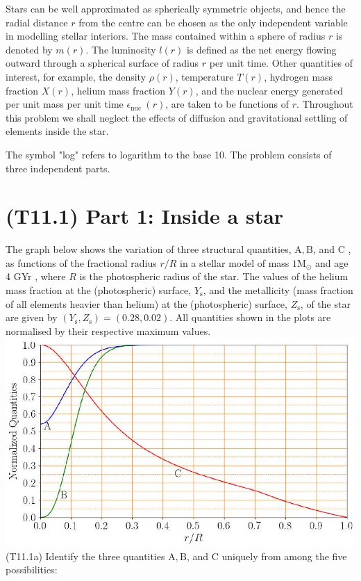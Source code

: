 \documentclass[10pt]{article}
\begin{document}
    Stars can be well approximated as spherically symmetric objects, and hence the radial distance $r$ from the centre can be chosen as the only independent variable in modelling stellar interiors. The mass contained within a sphere of radius $r$ is denoted by $m(r)$. The luminosity $l(r)$ is defined as the net energy flowing outward through a spherical surface of radius $r$ per unit time. Other quantities of interest, for example, the density $\rho(r)$, temperature $T(r)$, hydrogen mass fraction $X(r)$, helium mass fraction $Y(r)$, and the nuclear energy generated per unit mass per unit time $\epsilon_{\text {nuc }}(r)$, are taken to be functions of $r$. Throughout this problem we shall neglect the effects of diffusion and gravitational settling of elements inside the star.

    The symbol "log" refers to logarithm to the base 10. The problem consists of three independent parts.
    
    \section*{(T11.1) Part 1: Inside a star}
    The graph below shows the variation of three structural quantities, $\mathrm{A}, \mathrm{B}$, and C , as functions of the fractional radius $r / R$ in a stellar model of mass $1 \mathrm{M}_{\odot}$ and age 4 GYr , where $R$ is the photospheric radius of the star. The values of the helium mass fraction at the (photospheric) surface, $Y_{\mathrm{s}}$, and the metallicity (mass fraction of all elements heavier than helium) at the (photospheric) surface, $Z_{\mathrm{s}}$, of the star are given by $\left(Y_{\mathrm{s}}, Z_{\mathrm{s}}\right)=(0.28,0.02)$. All quantities shown in the plots are normalised by their respective maximum values.\\
    \includegraphics[max width=\textwidth, center]{2025_08_23_e94579452776a99c4850g-14(1)}\\
    (T11.1a) Identify the three quantities $\mathrm{A}, \mathrm{B}$, and C uniquely from among the five possibilities:
    
\end{document}
